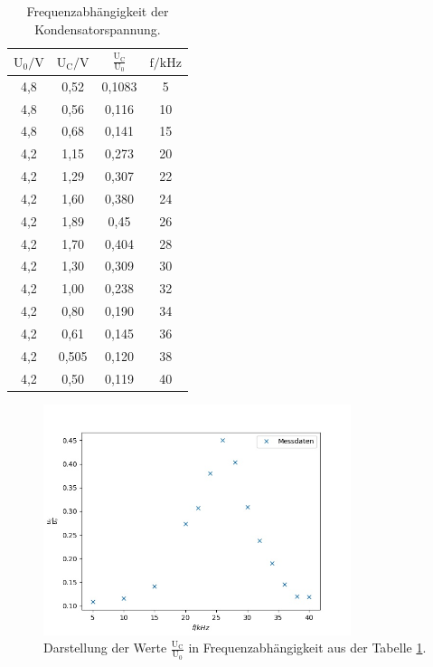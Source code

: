 \begin{table}[H]
    \centering
    \caption{Frequenzabhängigkeit der Kondensatorspannung.}
    \label{Tabelle2}
    \begin{tabular} {c   c   c   c}
        \toprule
        {$ \text{U}_{0} \mathrm{/} \unit{\volt} $} &
        {$ \text{U}_{\text{C}} \mathrm{/} \unit{\volt} $} &
        {$ \frac{\text{U}_{\text{C}}}{\text{U}_{0}} $} &
        {$ \text{f} \mathrm{/} \unit{\kilo\hertz} $}\\
        \midrule
        4,8 & 0,52 & 0,1083 & 5  \\
        4,8 & 0,56 & 0,116  & 10 \\
        4,8 & 0,68 & 0,141  & 15 \\ 
        4,2 & 1,15 & 0,273  & 20 \\
        4,2 & 1,29 & 0,307  & 22 \\
        4,2 & 1,60 & 0,380  & 24 \\
        4,2 & 1,89 & 0,45   & 26 \\
        4,2 & 1,70 & 0,404  & 28 \\
        4,2 & 1,30 & 0,309  & 30 \\
        4,2 & 1,00 & 0,238  & 32 \\
        4,2 & 0,80 & 0,190  & 34 \\
        4,2 & 0,61 & 0,145  & 36 \\
        4,2 & 0,505& 0,120  & 38 \\
        4,2 & 0,50 & 0,119  & 40 \\
        \bottomrule
    \end{tabular} 
\end{table}


\begin{figure}[H]
    \centering
    \includegraphics[width=90mm]{bilder/Ab11.jpeg}
    \caption{Darstellung der Werte $\frac{\text{U}_{\text{C}}}{\text{U}_{0}}$ in Frequenzabhängigkeit aus der Tabelle \ref{Tabelle2}. \label{Abbildung11} }
\end{figure}

